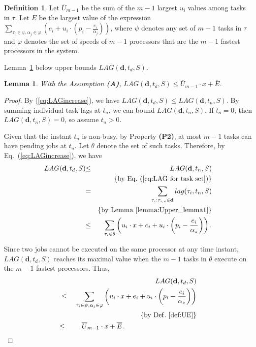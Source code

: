 \documentclass[Times, 10pt,twocolumn]{article}
\newtheorem{lemma}{\textbf{Lemma}}
\theoremstyle{definition}
\newtheorem{definition}{\textbf{Definition}}
\begin{document}
\begin{definition}
\label{def:UE}
Let $\overline{U}_{m-1}$ be the sum of the $m-1$ largest $u_i$ values among tasks in $\tau$. Let $\overline{E}$ be the largest value of the expression $ \sum_{\tau_i \in \psi,\alpha_{j} \in \varphi}  (e_i+u_i \cdot (p_i- \frac{e_i}{\alpha_{j}}))$, where $\psi$ denotes any set of $m-1$ tasks in $\tau$ and $\varphi$ denotes the set of speeds of $m-1$ processors that are the $m-1$ fastest processors in the system.
\end{definition}

Lemma~\ref{lemma:Upper_lemma2} below upper bounds $LAG(\textbf{d}, t_d, {S})$.

\begin{lemma}
\label{lemma:Upper_lemma2}
With the Assumption \textbf{(A)}, $LAG(\textbf{d}, t_d, {S}) \leq \overline{U}_{m-1} \cdot x + \overline{E}$.
\end{lemma}
\begin{proof}

By (\ref{eq:LAGincrease}), we have $LAG(\textbf{d}, t_d, {S}) \leq LAG(\textbf{d}, t_n, {S})$. By summing individual task lags at $t_n$, we can bound $LAG(\textbf{d}, t_n, {S})$. If $t_n=0$, then $LAG(\textbf{d}, t_n, {S})=0$, so assume $t_n > 0$.


Given that the instant $t_n$ is non-busy, by Property \textbf{(P2)}, at most $m-1$ tasks can have pending jobs at $t_n$. Let $\theta$ denote the set of such tasks. Therefore, by Eq.~(\ref{eq:LAGincrease}), we have
\begin{eqnarray*}
\label{lemma3}
LAG(\textbf{d}, t_d, {S})  &{\leq}& LAG(\textbf{d}, t_n, {S})  \\
&&{\lbrace \rm{by}~Eq.~(\ref{eq:LAG for task set}) \rbrace}\\ 
&{=}& \sum_{\tau_i: \tau_{i,v} \in \textbf{d}} lag(\tau_i, t_n, {S}) \nonumber \\
&&{\lbrace \rm{by}~\rm{Lemma}~\ref{lemma:Upper_lemma1} \rbrace} \\
&{\leq}& \sum_{\tau_i \in \theta} \left( u_i \cdot x+e_i+u_i \cdot \left(p_i- \frac{e_i}{\alpha_{z}} \right) \right).
\end{eqnarray*}

Since two jobs cannot be executed on the same processor at any time instant, $ LAG(\textbf{d}, t_d, {S})$ reaches its maximal value when the  $m-1$ tasks in $\theta$ execute on the $m-1$ fastest processors. Thus, \\
\begin{eqnarray*}
&& LAG(\textbf{d}, t_d, {S}) \\ 
 &\leq\ & \sum_{\tau_i \in \psi,\alpha_{j} \in \varphi} \left( u_i \cdot x+e_i+u_i \cdot \left(p_i- \frac{e_i}{\alpha_{z}} \right) \right) \\ 
&&{\lbrace \rm{by}~\rm{Def.}~\ref{def:UE} \rbrace}\\
&{\leq}& \overline{U}_{m-1} \cdot x + \overline{E}. \hspace{37mm} \qedhere
\end{eqnarray*}
\end{proof}
\end{document}
